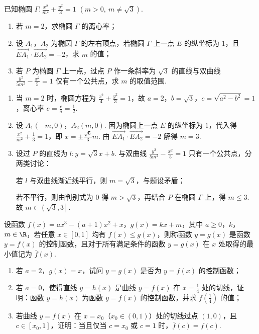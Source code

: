 \begin{problem}
已知椭圆 \(\Gamma:\frac{x^2}{m^2}+\frac{y^2}{3}=1\) \(\left(m>0,\ m\neq \sqrt3\right)\).

\begin{enumerate}
\item 若 \(m=2\)，求椭圆 \(\Gamma\) 的离心率；
\item 设 \(A_1\)，\(A_2\) 为椭圆 \(\Gamma\) 的左右顶点，若椭圆 \(\Gamma\) 上一点 \(E\) 的纵坐标为 \(1\)，且 \(\overrightarrow{EA_1}\cdot\overrightarrow{EA_2}=-2\)，求 \(m\) 的值；
\item 若 \(P\) 为椭圆 \(\Gamma\) 上一点，过点 \(P\) 作一条斜率为 \(\sqrt3\) 的直线与双曲线 \(\frac{y^2}{5m^2}-\frac{x^2}{5}=1\) 仅有一个公共点，求 \(m\) 的取值范围.
\end{enumerate}
\end{problem}

\begin{solution}
\begin{enumerate}
\item 当 \(m=2\) 时，椭圆方程为 \(\frac{x^2}{4}+\frac{y^2}{3}=1\)，故 \(a=2\)，\(b=\sqrt3\)，\(c=\sqrt{a^2-b^2}=1\)，离心率 \(e=\frac{c}{a}=\frac12\).

\item 设 \(A_1(-m,0)\)，\(A_2(m,0)\). 因为椭圆上一点 \(E\) 的纵坐标为 \(1\)，代入得 \(\frac{x^2}{m^2}+\frac13=1\)，即 \(x=\pm \frac{\sqrt6}{3}m\). 由 \(\overrightarrow{EA_1}\cdot\overrightarrow{EA_2}=-2\) 解得 \(m=3\).

\item 设过 \(P\) 的直线为 \(l:y=\sqrt3x+b\). 与双曲线 \(\frac{y^2}{5m^2}-\frac{x^2}{5}=1\) 只有一个公共点，分两类讨论：

若 \(l\) 与双曲线渐近线平行，则 \(m=\sqrt3\)，与题设矛盾；

若不平行，则由判别式为 \(0\) 得 \(m>\sqrt3\)，再结合 \(P\) 在椭圆 \(\Gamma\) 上，得 \(m\le 3\). 故 \(m\in\left(\sqrt3,3\right]\).
\end{enumerate}
\end{solution}

\begin{problem}
设函数 \(f(x)=ax^3-(a+1)x^2+x\)，\(g(x)=kx+m\)，其中 \(a\ge 0\)，\(k\)，\(m\in \R\)，若任意 \(x\in[0,1]\) 均有 \(f(x)\le g(x)\)，则称函数 \(y=g(x)\) 是函数 \(y=f(x)\) 的控制函数，且对于所有满足条件的函数 \(y=g(x)\) 在 \(x\) 处取得的最小值记为 \(\bar f(x)\).

\begin{enumerate}
\item 若 \(a=2\)，\(g(x)=x\)，试问 \(y=g(x)\) 是否为 \(y=f(x)\) 的控制函数；
\item 若 \(a=0\)，使得直线 \(y=h(x)\) 是曲线 \(y=f(x)\) 在 \(x=\frac14\) 处的切线，证明：函数 \(y=h(x)\) 为函数 \(y=f(x)\) 的控制函数，并求 \(\bar f\left(\frac14\right)\) 的值；
\item 若曲线 \(y=f(x)\) 在 \(x=x_0\)（\(x_0\in(0,1)\)）处的切线过点 \((1,0)\)，且 \(c\in[x_0,1]\)，证明：当且仅当 \(c=x_0\) 或 \(c=1\) 时，\(\bar f(c)=f(c)\).
\end{enumerate}
\end{problem}

